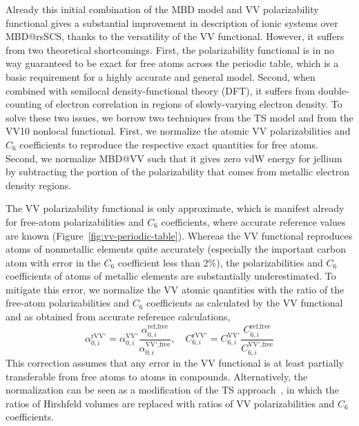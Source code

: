 Already this initial combination of the MBD model and VV polarizability functional gives a substantial improvement in description of ionic systems over MBD@rsSCS, thanks to the versatility of the VV functional.
However, it suffers from two theoretical shortcomings.
First, the polarizability functional is in no way guaranteed to be exact for free atoms across the periodic table, which is a basic requirement for a highly accurate and general model.
Second, when combined with semilocal density-functional theory (DFT), it suffers from double-counting of electron correlation in regions of slowly-varying electron density.
To solve these two issues, we borrow two techniques from the TS model and from the VV10 nonlocal functional.
First, we normalize the atomic VV polarizabilities and $C_6$ coefficients to reproduce the respective exact quantities for free atoms.
Second, we normalize MBD@VV such that it gives zero vdW energy for jellium by subtracting the portion of the polarizability that comes from metallic electron density regions.

The VV polarizability functional is only approximate, which is manifest already for free-atom polarizabilities and $C_6$ coefficients, where accurate reference values are known (Figure~\ref{fig:vv-periodic-table}).
Whereas the VV functional reproduces atoms of nonmetallic elements quite accurately (especially the important carbon atom with error in the $C_6$ coefficient less than 2\%), the polarizabilities and $C_6$ coefficients of atoms of metallic elements are substantially underestimated.
To mitigate this error, we normalize the VV atomic quantities with the ratio of the free-atom polarizabilities and $C_6$ coefficients as calculated by the VV functional and as obtained from accurate reference calculations,
\begin{equation}
  \alpha_{0,i}^\text{rVV$'$}=\alpha_{0,i}^\mathrm{VV'}\frac{\alpha_{0,i}^\text{ref,free}}{\alpha_{0,i}^\text{VV$'$,free}},\quad
  C_{6,i}^\text{rVV$'$}=C_{6,i}^\mathrm{VV'}\frac{C_{6,i}^\text{ref,free}}{C_{6,i}^\text{VV$'$,free}}
\end{equation}
This correction assumes that any error in the VV functional is at least partially transferable from free atoms to atoms in compounds.
Alternatively, the normalization can be seen as a modification of the TS approach~\citep{TkatchenkoPRL09}, in which the ratios of Hirshfeld volumes are replaced with ratios of VV polarizabilities and $C_6$ coefficients.

